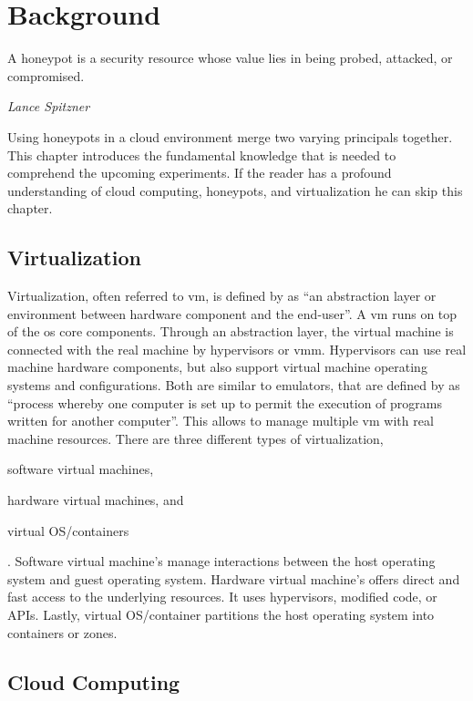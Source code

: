 \chapter{Background}
\label{chap:background}

\epigraph{A honeypot is a security resource whose value lies in being probed, attacked, or compromised.}{\textit{Lance Spitzner}}

Using honeypots in a cloud environment merge two varying principals together.
This chapter introduces the fundamental knowledge that is needed to comprehend the upcoming experiments.
If the reader has a profound understanding of cloud computing, honeypots, and virtualization he can skip this chapter.

\section{Virtualization}

Virtualization, often referred to \ac{vm}, is defined by \citet{kreuter2004} as \enquote{an abstraction layer or environment between hardware component and the end-user}.
A \ac{vm} runs on top of the \ac{os} core components.
Through an abstraction layer, the virtual machine is connected with the real machine by hypervisors or \ac{vmm}.
Hypervisors can use real machine hardware components, but also support virtual machine operating systems and configurations.
Both are similar to emulators, that are defined by \citet{lichstei1969} as \enquote{process whereby one computer is set up to permit the execution of programs written for another computer}.
This allows to manage multiple \ac{vm} with real machine resources.
There are three different types of virtualization,
\begin{enumerate*}[label=(\roman*)]
    \item software virtual machines,
    \item hardware virtual machines, and
    \item virtual OS/containers
\end{enumerate*}.
Software virtual machine's manage interactions between the host operating system and guest operating system.
Hardware virtual machine's offers direct and fast access to the underlying resources.
It uses hypervisors, modified code, or APIs.
Lastly, virtual OS/container partitions the host operating system into containers or zones.
\cite{daniels2009}

\section{Cloud Computing}
\label{sec:cloud-computing}

